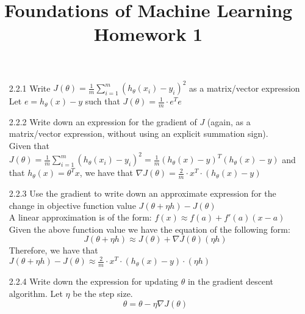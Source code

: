 \documentclass{article}
\title{Foundations of Machine Learning Homework 1}
\begin{document}
	\maketitle
	\begin{enumerate}
		\item [2.2.1] Write $J(\theta) = \frac{1}{m} \sum_{i=1}^{m} (h_{\theta}(x_i) - y_i)^2$ as a matrix/vector expression\\
		Let $e = h_{\theta}(x) - y$ such that $J(\theta) = \frac{1}{m} \cdot e^Te$
		\item [2.2.2] Write down an expression for the gradient of $J$ (again, as a matrix/vector expression, without using an explicit summation sign). \\
		Given that $J(\theta) = \frac{1}{m} \sum_{i=1}^{m} (h_{\theta}(x_i) - y_i)^2 = \frac{1}{m}(h_{\theta}(x) - y)^T(h_{\theta}(x) - y)$ and that $h_{\theta}(x) = \theta^Tx$, we have that $\nabla J(\theta) = \frac{2}{m} \cdot x^T \cdot (h_{\theta}(x) - y)$
		\item [2.2.3] Use the gradient to write down an approximate expression for the change in objective function value $J(\theta + \eta h) - J(\theta)$ \\
		A linear approximation is of the form: $f(x) \approx f(a) + f'(a)(x - a)$ \\
		Given the above function value we have the equation of the following form: $$J(\theta + \eta h) \approx J(\theta) + \nabla J(\theta)(\eta h)$$
		Therefore, we have that $J(\theta + \eta h) - J(\theta) \approx \frac{2}{m} \cdot x^T \cdot (h_{\theta}(x) - y) \cdot (\eta h)$
		\item [2.2.4] Write down the expression for updating $\theta$ in the gradient descent algorithm. Let $\eta$ be the step size. 
		$$\theta = \theta - \eta \nabla J(\theta)$$
	\end{enumerate}
\end{document}

